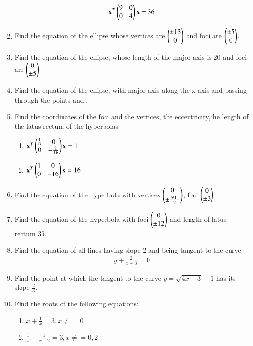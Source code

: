 \begin{enumerate}[label=\arabic*.,ref=\thesubsection.\theenumi]
%
\begin{align}
\mathbf{x}^T\begin{pmatrix}9 & 0 \\ 0 & 4\end{pmatrix}\mathbf{x} = 36
\end{align}
%
\item Find the equation of the ellipse whose vertices are $\begin{pmatrix}\pm 13\\ 0\end{pmatrix}$ and foci are $\begin{pmatrix}\pm 5\\ 0\end{pmatrix}$.
%
\item Find the equation of the ellipse, whose length of the major axis is 20 and foci are $\begin{pmatrix}0\\ \pm 5\end{pmatrix}$
%
\item Find the equation of the ellipse, with major axis along the x-axis and passing through the points  and .
%
\item Find the coordinates of the foci and the vertices, the eccentricity,the length of the latus rectum of the hyperbolas
\begin{enumerate}
\item 
$
\mathbf{x}^T\begin{pmatrix}\frac{1}{9} & 0 \\ 0 & -\frac{1}{16}\end{pmatrix}\mathbf{x} = 1
$
\item 
$
\mathbf{x}^T\begin{pmatrix}1 & 0 \\ 0 & -16\end{pmatrix}\mathbf{x} = 16
$
\end{enumerate}
\item Find the equation of the hyperbola with  vertices $\begin{pmatrix}0 \\ \pm \frac{\sqrt{11}}{2}\end{pmatrix}$, foci $\begin{pmatrix} 0\\ \pm 3\end{pmatrix}$
\item Find the equation of the hyperbola with   foci $\begin{pmatrix} 0\\ \pm 12\end{pmatrix}$ and length of latus rectum 36.
%
\item Find the equation of all lines having slope 2 and being tangent to the curve
\begin{align}
y + \frac{2}{x-3} = 0
\end{align}
%
\item Find the point at which the tangent to the curve $y = \sqrt{4x-3}-1$ has its 
slope $\frac{2}{3}$.
%
\item Find the roots of the following equations:
\begin{enumerate}
\item  $x + \frac{1}{x} = 3, x \ne =0 $
\item  $ \frac{1}{x} + \frac{1}{x-2}=3, x\ne =0, 2 $

\end{enumerate}
\end{enumerate}
